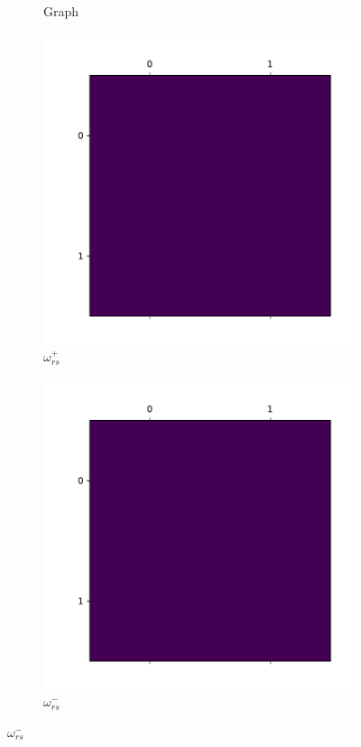 \documentclass{beamer}
\begin{document}
\begin{frame}[c]
\begin{figure}
\begin{center}
\begin{subfigure}[b]{0.2\textwidth}
				\caption{Graph}
				\label{fig:}
			\end{subfigure}
			\begin{subfigure}[b]{0.2\textwidth}
				\centering
				\includegraphics[width=\textwidth]{out/synthetic/omega_positive4.pdf}
				\caption{$\omega ^{+} _{rs} $}
				\label{fig:out/synthetic/omega_positive4.pdf}
			\end{subfigure}
			\begin{subfigure}[b]{0.2\textwidth}
				\centering
				\includegraphics[width=\textwidth]{out/synthetic/omega_negative4.pdf}
				\caption{$\omega ^{-} _{rs} $}
				\label{fig:}
			\end{subfigure}
		\end{center}
	\end{figure}


\end{frame}
\end{document}

